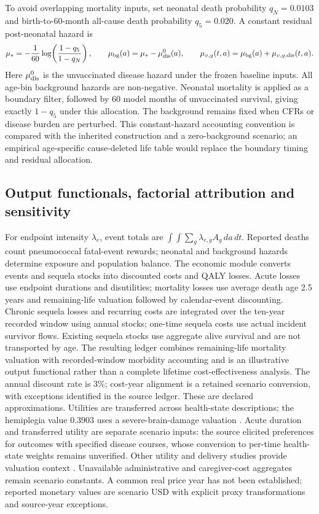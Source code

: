 \documentclass[10pt,letterpaper]{article}
\begin{document}
To avoid overlapping mortality inputs, set neonatal death probability $q_N=0.0103$ and birth-to-60-month all-cause death probability $q_5=0.020$. A constant residual post-neonatal hazard is
\begin{equation}
 \mu_*= -\frac1{60}\log\!\left(\frac{1-q_5}{1-q_N}\right),\qquad
 \mu_{\rm bg}(a)=\mu_*-\mu^{0}_{\rm dis}(a),\qquad
 \mu_{v,g}(t,a)=\mu_{\rm bg}(a)+\mu_{v,g,\rm dis}(t,a).
 \label{eq:mortality}
\end{equation}
Here $\mu^{0}_{\rm dis}$ is the unvaccinated disease hazard under the frozen baseline inputs. All age-bin background hazards are non-negative. Neonatal mortality is applied as a boundary filter, followed by 60 model months of unvaccinated survival, giving exactly $1-q_5$ under this allocation. The background remains fixed when CFRs or disease burden are perturbed. This constant-hazard accounting convention is compared with the inherited construction and a zero-background scenario; an empirical age-specific cause-deleted life table would replace the boundary timing and residual allocation.

\subsection{Output functionals, factorial attribution and sensitivity}
For endpoint intensity $\lambda_e$, event totals are $\int\int\sum_g\lambda_{e,g}A_g\,da\,dt$. Reported deaths count pneumococcal fatal-event rewards; neonatal and background hazards determine exposure and population balance. The economic module converts events and sequela stocks into discounted costs and QALY losses. Acute losses use endpoint durations and disutilities; mortality losses use average death age 2.5 years and remaining-life valuation followed by calendar-event discounting. Chronic sequela losses and recurring costs are integrated over the ten-year recorded window using annual stocks; one-time sequela costs use actual incident survivor flows. Existing sequela stocks use aggregate alive survival and are not transported by age. The resulting ledger combines remaining-life mortality valuation with recorded-window morbidity accounting and is an illustrative output functional rather than a complete lifetime cost-effectiveness analysis. The annual discount rate is 3\%; cost-year alignment is a retained scenario conversion, with exceptions identified in the source ledger. These are declared approximations. Utilities are transferred across health-state descriptions; the hemiplegia value 0.3903 uses a severe-brain-damage valuation \cite{Bennett2000}. Acute duration and transferred utility are separate scenario inputs: the source elicited preferences for outcomes with specified disease courses, whose conversion to per-time health-state weights remains unverified. Other utility and delivery studies provide valuation context \cite{Oh1996,Oostenbrink2002,vanHoek2012,Mai2022}. Unavailable administrative and caregiver-cost aggregates remain scenario constants. A common real price year has not been established; reported monetary values are scenario USD with explicit proxy transformations and source-year exceptions.
\end{document}
